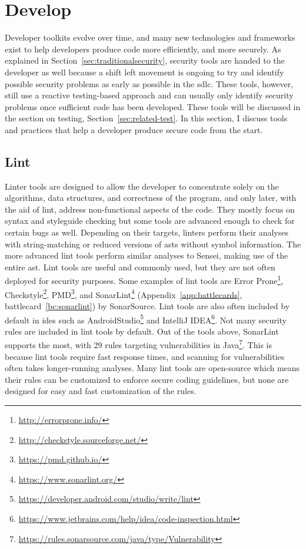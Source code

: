 \section{Develop}

Developer toolkits evolve over time, and many new technologies and frameworks exist to help developers produce code more efficiently, and more securely.
As explained in Section~\ref{sec:traditionalsecurity}, security tools are handed to the developer as well because a shift left movement is ongoing to try and identify possible security problems as early as possible in the \gls{sdlc}.
These tools, however, still use a reactive testing-based approach and can usually only identify security problems once sufficient code has been developed.
These tools will be discussed in the section on testing, Section~\ref{sec:related-test}.
In this section, I discuss tools and practices that help a developer produce secure code from the start.

\subsection{Lint}
Linter tools are designed to allow the developer to concentrate solely on the algorithms, data structures, and correctness of the program, and only later, with the aid of lint, address non-functional aspects of the code.
They mostly focus on syntax and styleguide checking but some tools are advanced enough to check for certain bugs as well.
Depending on their targets, linters perform their analyses with string-matching or reduced versions of \glspl{ast} without symbol information.
The more advanced lint tools perform similar analyses to Sensei, making use of the entire \gls{ast}.
Lint tools are useful and commonly used, but they are not often deployed for security purposes.
Some examples of lint tools are Error Prone\footnote{\url{http://errorprone.info/}}, Checkstyle\footnote{\url{http://checkstyle.sourceforge.net/}}, PMD\footnote{\url{https://pmd.github.io/}}, and SonarLint\footnote{\url{https://www.sonarlint.org/}} (Appendix~\ref{app:battlecards}, battlecard~\ref{bc:sonarlint}) by SonarSource.
Lint tools are also often included by default in \glspl{ide} such as AndroidStudio\footnote{\url{https://developer.android.com/studio/write/lint}} and IntelliJ IDEA\footnote{\url{https://www.jetbrains.com/help/idea/code-inspection.html}}.
Not many security rules are included in lint tools by default.
Out of the tools above, SonarLint supports the most, with 29 rules targeting vulnerabilities in Java\footnote{\url{https://rules.sonarsource.com/java/type/Vulnerability}}.
This is because lint tools require fast response times, and scanning for vulnerabilities often takes longer-running analyses.
Many lint tools are open-source which means their rules can be customized to enforce secure coding guidelines, but none are designed for easy and fast customization of the rules.

